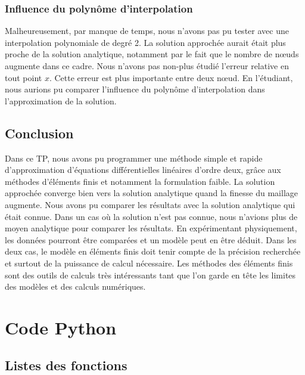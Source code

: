 \documentclass[a4paper,10pt]{report} %
\begin{document}
\subsection{Influence du polynôme d'interpolation}

Malheureusement, par manque de temps, nous n'avons pas pu tester avec une interpolation polynomiale de degré 2. La solution approchée aurait était plus proche de la solution analytique, notamment par le fait que le nombre de nœuds augmente dans ce cadre.
Nous n'avons pas non-plus étudié l'erreur relative en tout point $x$. Cette erreur est plus importante entre deux nœud. En l'étudiant, nous aurions pu comparer l'influence du polynôme d'interpolation dans l'approximation de la solution.

\section{Conclusion}

Dans ce TP, nous avons pu programmer une méthode simple et rapide d'approximation d'équations différentielles linéaires d'ordre deux, grâce aux méthodes d'éléments finis et notamment la formulation faible. La solution approchée converge bien vers la solution analytique quand la finesse du maillage augmente.
Nous avons pu comparer les résultats avec la solution analytique qui était connue. 
Dans un cas où la solution n'est pas connue, nous n'avions plus de moyen analytique pour comparer les résultats. En expérimentant physiquement, les données pourront être comparées et un modèle peut en être déduit.
Dans les deux cas, le modèle en éléments finis doit tenir compte de la précision recherchée et surtout de la puissance de calcul nécessaire.
Les méthodes des éléments finis sont des outils de calculs très intéressants tant que l'on garde en tête les limites des modèles et des calculs numériques.

%
%
	

\appendix 
\chapter{Code Python}
\section{Listes des fonctions}
\end{document}
